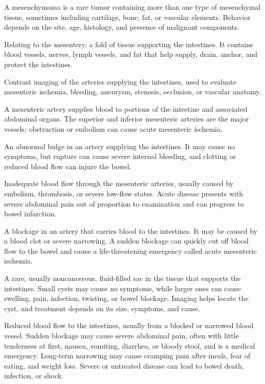  A mesenchymoma is a rare tumor containing more than one type of mesenchymal tissue, sometimes including cartilage, bone, fat, or vascular elements. Behavior depends on the site, age, histology, and presence of malignant components.

 Relating to the mesentery, a fold of tissue supporting the intestines. It contains blood vessels, nerves, lymph vessels, and fat that help supply, drain, anchor, and protect the intestines.

 Contrast imaging of the arteries supplying the intestines, used to evaluate mesenteric ischemia, bleeding, aneurysm, stenosis, occlusion, or vascular anatomy.

 A mesenteric artery supplies blood to portions of the intestine and associated abdominal organs. The superior and inferior mesenteric arteries are the major vessels; obstruction or embolism can cause acute mesenteric ischemia.

 An abnormal bulge in an artery supplying the intestines. It may cause no symptoms, but rupture can cause severe internal bleeding, and clotting or reduced blood flow can injure the bowel.

 Inadequate blood flow through the mesenteric arteries, usually caused by embolism,
thrombosis, or severe low-flow states. Acute disease presents with severe abdominal pain
out of proportion to examination and can progress to bowel infarction.

 A blockage in an artery that carries blood to the intestines. It may be caused by a blood clot or severe narrowing. A sudden blockage can quickly cut off blood flow to the bowel and cause a life-threatening emergency called acute mesenteric ischemia.

 A rare, usually noncancerous, fluid-filled sac in the tissue that supports the intestines. Small cysts may cause no symptoms, while larger ones can cause swelling, pain, infection, twisting, or bowel blockage. Imaging helps locate the cyst, and treatment depends on its size, symptoms, and cause.

 Reduced blood flow to the intestines, usually from a blocked or narrowed blood vessel. Sudden blockage may cause severe abdominal pain, often with little tenderness at first, nausea, vomiting, diarrhea, or bloody stool, and is a medical emergency. Long-term narrowing may cause cramping pain after meals, fear of eating, and weight loss. Severe or untreated disease can lead to bowel death, infection, or shock.

